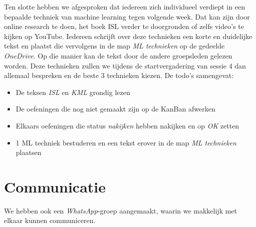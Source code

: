 \documentclass{article}
\begin{document}
Ten slotte hebben we afgesproken dat iedereen zich individueel verdiept in een bepaalde techniek van machine learning tegen volgende week. Dat kan zijn door online research te doen, het boek ISL verder te doorgronden of zelfs video's te kijken op YouTube. Iedereen schrijft over deze technieken een korte en duidelijke tekst en plaatst die vervolgens in de map \textit{ML technieken} op de gedeelde \textit{OneDrive}. Op die manier kan de tekst door de andere groepsleden gelezen worden. Deze technieken zullen we tijdens de startvergadering van sessie 4 dan allemaal bespreken en de beste 3 technieken kiezen. De todo's samengevat:

\begin{itemize}
	\item De teksen \textit{ISL} en \textit{KML} grondig lezen
	\item De oefeningen die nog niet gemaakt zijn op de KanBan afwerken
	\item Elkaars oefeningen die status \textit{nakijken} hebben nakijken en op \textit{OK} zetten
	\item 1 ML techniek bestuderen en een tekst erover in de map \textit{ML technieken} plaatsen
\end{itemize}

\section*{Communicatie}

We hebben ook een \textit{WhatsApp}-groep aangemaakt, waarin we makkelijk met elkaar kunnen communiceren.
\end{document}
